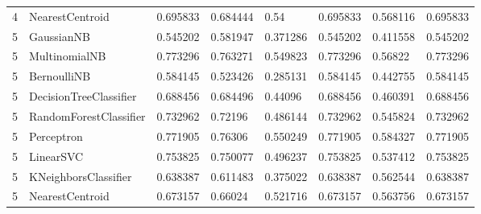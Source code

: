 \documentclass{article}
\begin{document}
\begin{table}[h]
\begin{tabular}{llllllll}
4             & NearestCentroid        & 0.695833          & 0.684444          & 0.54                  & 0.695833              & 0.568116                 & 0.695833                 \\
5             & GaussianNB             & 0.545202          & 0.581947          & 0.371286              & 0.545202              & 0.411558                 & 0.545202                 \\
5             & MultinomialNB          & 0.773296          & 0.763271          & 0.549823              & 0.773296              & 0.56822                  & 0.773296                 \\
5             & BernoulliNB            & 0.584145          & 0.523426          & 0.285131              & 0.584145              & 0.442755                 & 0.584145                 \\
5             & DecisionTreeClassifier & 0.688456          & 0.684496          & 0.44096               & 0.688456              & 0.460391                 & 0.688456                 \\
5             & RandomForestClassifier & 0.732962          & 0.72196           & 0.486144              & 0.732962              & 0.545824                 & 0.732962                 \\
5             & Perceptron             & 0.771905          & 0.76306           & 0.550249              & 0.771905              & 0.584327                 & 0.771905                 \\
5             & LinearSVC              & 0.753825          & 0.750077          & 0.496237              & 0.753825              & 0.537412                 & 0.753825                 \\
5             & KNeighborsClassifier   & 0.638387          & 0.611483          & 0.375022              & 0.638387              & 0.562544                 & 0.638387                 \\
5             & NearestCentroid        & 0.673157          & 0.66024           & 0.521716              & 0.673157              & 0.563756                 & 0.673157
\end{tabular}
\end{table}
\end{document}
